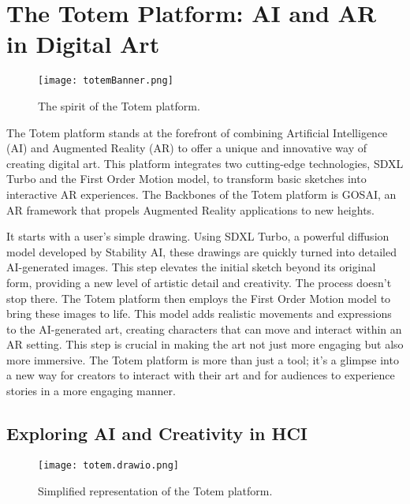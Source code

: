 
\section{The Totem Platform: AI and AR in Digital Art}

\begin{figure}[h]
    \centering
    \texttt{[image: totemBanner.png]}
    \caption{The spirit of the Totem platform.}
    \vspace{0.1cm}
    \label{fig:spiritofTotem}
\end{figure}

The Totem platform stands at the forefront of combining Artificial Intelligence (AI) and Augmented Reality (AR) to offer a unique and innovative way of creating digital art.
This platform integrates two cutting-edge technologies, SDXL Turbo\cite{sauer2023adversarial} and the First Order Motion model\cite{Siarohin_2019_NeurIPS}, to transform basic sketches into interactive AR experiences.
The Backbones of the Totem platform is GOSAI\cite{gosai2022}, an AR framework that propels Augmented Reality applications to new heights.

It starts with a user's simple drawing. Using SDXL Turbo, a powerful diffusion model developed by Stability AI, these drawings are quickly turned into detailed AI-generated images.
This step elevates the initial sketch beyond its original form, providing a new level of artistic detail and creativity. The process doesn't stop there.
The Totem platform then employs the First Order Motion model to bring these images to life.
This model adds realistic movements and expressions to the AI-generated art, creating characters that can move and interact within an AR setting.
This step is crucial in making the art not just more engaging but also more immersive.
The Totem platform is more than just a tool; it's a glimpse into a new way for creators to interact with their art and for audiences to experience stories in a more engaging manner.


\subsection{Exploring AI and Creativity in HCI}

\begin{figure}[h]
    \centering
    \texttt{[image: totem.drawio.png]}
    \caption{Simplified representation of the Totem platform.}
    \vspace{0.1cm}
    \label{fig:totemImage}
\end{figure}


